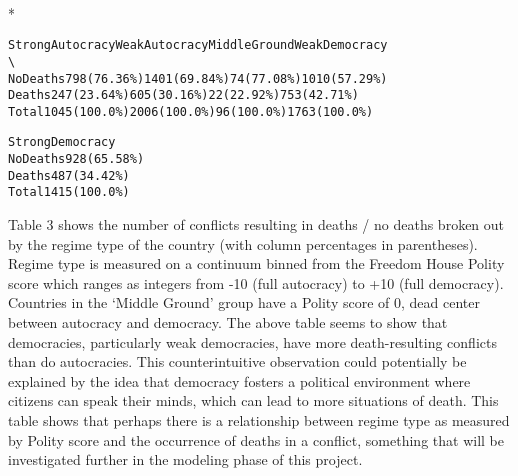 \documentclass[letterpaper,10pt,english]{/usr/share/sphinx/texinputs/sphinxhowto}
\def\smaller{\fontsize{9.5pt}{9.5pt}\selectfont}
\newenvironment{InvisibleVerbatim}
        {\begin{mdframed}[leftmargin=0.1\linewidth,innerleftmargin=3pt,innerrightmargin=3pt, userdefinedwidth=1\linewidth, linewidth=0pt, linecolor=white, usetwoside=false]}
        {\end{mdframed}}
\begin{document}
                \makebox[0.1\linewidth]{\smaller\hfill\tt\color{nbframe-out-prompt}Out\hspace{4pt}{[}37{]}:\hspace{4pt}}\\*
                \vspace{-2.55\baselineskip}\begin{InvisibleVerbatim}
                \vspace{-0.5\baselineskip}
\begin{alltt}          Strong Autocracy Weak Autocracy Middle Ground Weak Democracy
\textbackslash{}
No Deaths     798 (76.36\%)  1401 (69.84\%)   74 (77.08\%)  1010 (57.29\%)
Deaths        247 (23.64\%)   605 (30.16\%)   22 (22.92\%)   753 (42.71\%)
Total        1045 (100.0\%)  2006 (100.0\%)   96 (100.0\%)  1763 (100.0\%)

          Strong Democracy
No Deaths     928 (65.58\%)
Deaths        487 (34.42\%)
Total        1415 (100.0\%)\end{alltt}

            \end{InvisibleVerbatim}
            
        
    
Table 3 shows the number of conflicts resulting in deaths / no deaths
broken out by the regime type of the country (with column percentages in
parentheses). Regime type is measured on a continuum binned from the
Freedom House Polity score which ranges as integers from -10 (full
autocracy) to +10 (full democracy). Countries in the `Middle Ground'
group have a Polity score of 0, dead center between autocracy and
democracy. The above table seems to show that democracies, particularly
weak democracies, have more death-resulting conflicts than do
autocracies. This counterintuitive observation could potentially be
explained by the idea that democracy fosters a political environment
where citizens can speak their minds, which can lead to more situations
of death. This table shows that perhaps there is a relationship between
regime type as measured by Polity score and the occurrence of deaths in
a conflict, something that will be investigated further in the modeling
phase of this project.

\end{document}
